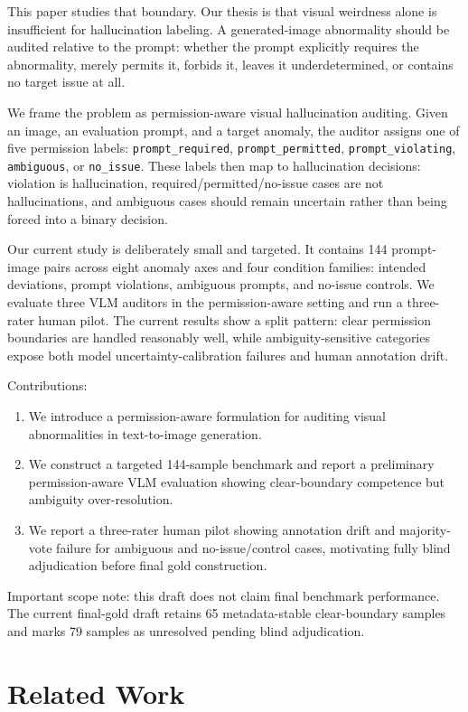 \documentclass[11pt]{article}
\begin{document}
This paper studies that boundary. Our thesis is that visual weirdness alone is insufficient for hallucination labeling. A generated-image abnormality should be audited relative to the prompt: whether the prompt explicitly requires the abnormality, merely permits it, forbids it, leaves it underdetermined, or contains no target issue at all.

We frame the problem as permission-aware visual hallucination auditing. Given an image, an evaluation prompt, and a target anomaly, the auditor assigns one of five permission labels: \texttt{prompt\_required}, \texttt{prompt\_permitted}, \texttt{prompt\_violating}, \texttt{ambiguous}, or \texttt{no\_issue}. These labels then map to hallucination decisions: violation is hallucination, required/permitted/no-issue cases are not hallucinations, and ambiguous cases should remain uncertain rather than being forced into a binary decision.

Our current study is deliberately small and targeted. It contains 144 prompt-image pairs across eight anomaly axes and four condition families: intended deviations, prompt violations, ambiguous prompts, and no-issue controls. We evaluate three VLM auditors in the permission-aware setting and run a three-rater human pilot. The current results show a split pattern: clear permission boundaries are handled reasonably well, while ambiguity-sensitive categories expose both model uncertainty-calibration failures and human annotation drift.

Contributions:
\begin{enumerate}[leftmargin=*]
\item We introduce a permission-aware formulation for auditing visual abnormalities in text-to-image generation.
\item We construct a targeted 144-sample benchmark and report a preliminary permission-aware VLM evaluation showing clear-boundary competence but ambiguity over-resolution.
\item We report a three-rater human pilot showing annotation drift and majority-vote failure for ambiguous and no-issue/control cases, motivating fully blind adjudication before final gold construction.
\end{enumerate}

Important scope note: this draft does not claim final benchmark performance. The current final-gold draft retains 65 metadata-stable clear-boundary samples and marks 79 samples as unresolved pending blind adjudication.

\section{Related Work}
\end{document}
